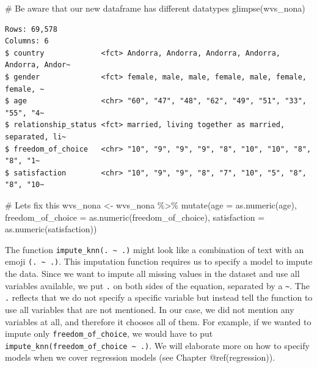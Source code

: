 \documentclass[
  letterpaper,
]{krantz}
\makeatletter
\newenvironment{Shaded}{\begin{snugshade}}{\end{snugshade}}
\newcommand{\AttributeTok}[1]{\textcolor[rgb]{0.40,0.45,0.13}{#1}}
\newcommand{\CommentTok}[1]{\textcolor[rgb]{0.37,0.37,0.37}{#1}}
\newcommand{\FunctionTok}[1]{\textcolor[rgb]{0.28,0.35,0.67}{#1}}
\newcommand{\NormalTok}[1]{\textcolor[rgb]{0.00,0.23,0.31}{#1}}
\newcommand{\OtherTok}[1]{\textcolor[rgb]{0.00,0.23,0.31}{#1}}
\newcommand{\SpecialCharTok}[1]{\textcolor[rgb]{0.37,0.37,0.37}{#1}}
\newenvironment{kframe}{%
\medskip{}
\setlength{\fboxsep}{.8em}
 \def\at@end@of@kframe{}%
 \ifinner\ifhmode%
  \def\at@end@of@kframe{\end{minipage}}%
  \begin{minipage}{\columnwidth}%
 \fi\fi%
 \def\FrameCommand##1{\hskip\@totalleftmargin \hskip-\fboxsep
 \colorbox{shadecolor}{##1}\hskip-\fboxsep
     \hskip-\linewidth \hskip-\@totalleftmargin \hskip\columnwidth}%
 \MakeFramed {\advance\hsize-\width
   \@totalleftmargin\z@ \linewidth\hsize
   \@setminipage}}%
 {\par\unskip\endMakeFramed%
 \at@end@of@kframe}
\renewenvironment{Shaded}{\begin{kframe}}{\end{kframe}}
\makeatother
\begin{document}
\begin{Shaded}
\begin{Highlighting}[]
\CommentTok{\# Be aware that our new dataframe has different datatypes}
\FunctionTok{glimpse}\NormalTok{(wvs\_nona)}
\end{Highlighting}
\end{Shaded}

\begin{verbatim}
Rows: 69,578
Columns: 6
$ country             <fct> Andorra, Andorra, Andorra, Andorra, Andorra, Andor~
$ gender              <fct> female, male, male, female, male, female, female, ~
$ age                 <chr> "60", "47", "48", "62", "49", "51", "33", "55", "4~
$ relationship_status <fct> married, living together as married, separated, li~
$ freedom_of_choice   <chr> "10", "9", "9", "9", "8", "10", "10", "8", "8", "1~
$ satisfaction        <chr> "10", "9", "9", "8", "7", "10", "5", "8", "8", "10~
\end{verbatim}

\begin{Shaded}
\begin{Highlighting}[]
\CommentTok{\# Let\textquotesingle{}s fix this}
\NormalTok{wvs\_nona }\OtherTok{\textless{}{-}}
\NormalTok{  wvs\_nona }\SpecialCharTok{\%\textgreater{}\%}
  \FunctionTok{mutate}\NormalTok{(}\AttributeTok{age =} \FunctionTok{as.numeric}\NormalTok{(age),}
         \AttributeTok{freedom\_of\_choice =} \FunctionTok{as.numeric}\NormalTok{(freedom\_of\_choice),}
         \AttributeTok{satisfaction =} \FunctionTok{as.numeric}\NormalTok{(satisfaction))}
\end{Highlighting}
\end{Shaded}

The function \texttt{impute\_knn(.\ \textasciitilde{}\ .)} might look
like a combination of text with an emoji
\texttt{(.\ \textasciitilde{}\ .)}. This imputation function requires us
to specify a model to impute the data. Since we want to impute all
missing values in the dataset and use all variables available, we put
\texttt{.} on both sides of the equation, separated by a
\texttt{\textasciitilde{}}. The \texttt{.} reflects that we do not
specify a specific variable but instead tell the function to use all
variables that are not mentioned. In our case, we did not mention any
variables at all, and therefore it chooses all of them. For example, if
we wanted to impute only \texttt{freedom\_of\_choice}, we would have to
put \texttt{impute\_knn(freedom\_of\_choice\ \textasciitilde{}\ .)}. We
will elaborate more on how to specify models when we cover regression
models (see Chapter @ref(regression)).
\end{document}
